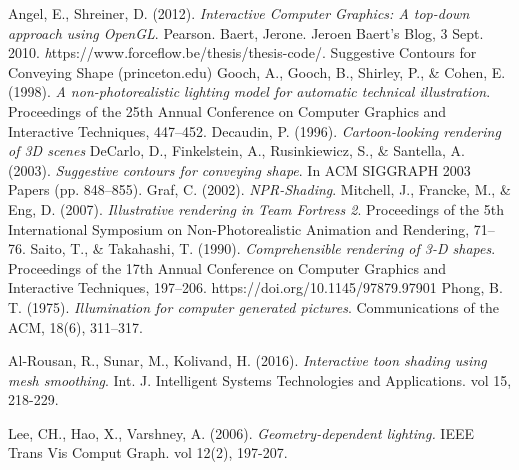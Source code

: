 \begin{thebibliography}{9}
Angel, E., Shreiner, D. (2012). \emph{Interactive Computer Graphics: A top-down approach using OpenGL}. Pearson.
Baert, Jerone. Jeroen Baert's Blog, 3 Sept. 2010. \emph https://www.forceflow.be/thesis/thesis-code/. Suggestive Contours for Conveying Shape (princeton.edu)
Gooch, A., Gooch, B., Shirley, P., \& Cohen, E. (1998). \emph{A non-photorealistic lighting model for automatic technical illustration}. Proceedings of the 25th Annual Conference on Computer Graphics and Interactive Techniques, 447–452.
Decaudin, P. (1996). \emph{Cartoon-looking rendering of 3D scenes}
DeCarlo, D., Finkelstein, A., Rusinkiewicz, S., \& Santella, A. (2003). \emph{Suggestive contours for conveying shape}. In ACM SIGGRAPH 2003 Papers (pp. 848–855).
Graf, C. (2002). \emph{NPR-Shading}.
Mitchell, J., Francke, M., \& Eng, D. (2007). \emph{Illustrative rendering in Team Fortress 2}. Proceedings of the 5th International Symposium on Non-Photorealistic Animation and Rendering, 71–76.
Saito, T., \& Takahashi, T. (1990). \emph{Comprehensible rendering of 3-D shapes}. Proceedings of the 17th Annual Conference on Computer Graphics and Interactive Techniques, 197–206. https://doi.org/10.1145/97879.97901
Phong, B. T. (1975). \emph{Illumination for computer generated pictures}. Communications of the ACM, 18(6), 311–317.

Al-Rousan, R., Sunar, M., Kolivand, H. (2016).  \emph{Interactive toon shading using mesh smoothing}. Int. J. Intelligent Systems Technologies and Applications. vol 15, 218-229.

Lee, CH., Hao, X., Varshney, A. (2006). \emph{Geometry-dependent lighting.} IEEE Trans Vis Comput Graph. vol 12(2), 197-207. 
\end{thebibliography}
